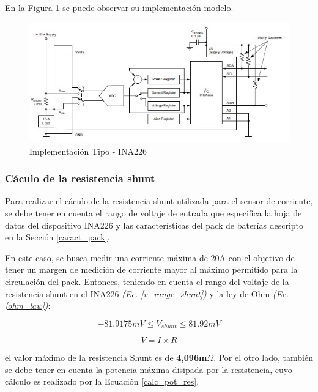 \documentclass[10pt,a4paper]{article}
\begin{document}
\begin{itemize}
En la Figura \ref{fig:ina226-commonimplementation} se puede observar su 
implementación modelo. 

\begin{figure}[h!]
    \begin{center}
	\includegraphics[width=0.7\linewidth]{assets/INA226-Common_Implementation}
	\caption{Implementación Tipo - INA226}
	\label{fig:ina226-commonimplementation}
    \end{center}	
\end{figure}
\FloatBarrier

\subsubsection{C\'aculo de la resistencia shunt}

Para realizar el c\'aculo de la resistencia shunt utilizada para el sensor de
corriente, se debe tener en cuenta el rango de voltaje de entrada que
especifica la hoja de datos del dispositivo INA226 y las caracter\'isticas del
pack de bater\'ias descripto en la Secci\'on \ref{caract_pack}. 

En este caso, se busca medir una corriente m\'axima de 20A con el objetivo de
tener un margen de medici\'on de corriente mayor al m\'aximo permitido para la
circulaci\'on del pack. Entonces, teniendo en cuenta el rango del voltaje de
la resistencia shunt en el INA226 \emph{(Ec. \ref{v_range_shunt})} y la ley de
Ohm \emph{(Ec. \ref{ohm_law})}:

\begin{equation}
    -81.9175mV \le V_{shunt} \le 81.92mV  \label{v_range_shunt}
\end{equation}

\begin{equation}
    V=I \times R \label{ohm_law}
\end{equation}

el valor m\'aximo de la resistencia Shunt es de \textbf{4,096m$\Omega$}. Por el
otro lado, tambi\'en se debe tener en cuenta la potencia m\'axima disipada por
la resistencia, cuyo c\'alculo es realizado por la Ecuaci\'on 
\ref{calc_pot_res},


\end{itemize}
\end{document}
